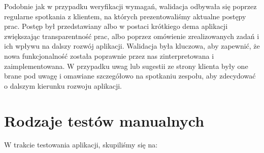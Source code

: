Podobnie jak w przypadku weryfikacji wymagań, walidacja odbywała się poprzez regularne spotkania z klientem, na których prezentowaliśmy aktualne postępy prac. Postęp był przedstawiany albo w postaci krótkiego dema aplikacji zwiększając transparentność prac, albo poprzez omówienie zrealizowanych zadań i ich wpływu na dalszy rozwój aplikacji. Walidacja była kluczowa, aby zapewnić, że nowa funkcjonalność została poprawnie przez nas zinterpretowana i zaimplementowana. W przypadku uwag lub sugestii ze strony klienta były one brane pod uwagę i omawiane szczegółowo na spotkaniu zespołu, aby zdecydować o dalszym kierunku rozwoju aplikacji.


\section{Rodzaje testów manualnych}

W trakcie testowania aplikacji, skupiliśmy się na:


